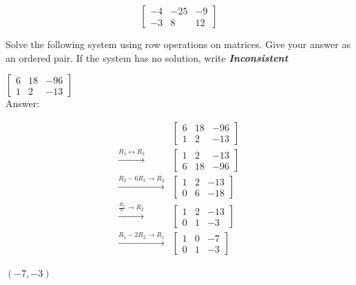 \documentclass[11pt]{exam}
\begin{document}
\begin{questions}
\begin{solution}
\[\boxed{ \left[\begin{array}{cc|c} -4 & -25 & -9 \\ -3 & 8 & 12 \end{array}\right] }\]
\end{solution}
\newpage

\question[6] Solve the following system using row operations on matrices. Give your answer as an ordered pair. If the system has no solution, write \textbf{\textit{Inconsistent}}\\
\renewcommand{\arraystretch}{1}

\(\displaystyle{ \left[\begin{array}{cc|c} 6 & 18 & -96 \\ 1 & 2 & -13 \end{array}\right] }\)\\

 Answer: \fillin[][2in]
\begin{solution}
\[\begin{aligned} & \left[\begin{array}{cc|c} 6 & 18 & -96 \\ 1 & 2 & -13 \end{array}\right] \\ \xrightarrow{R_1 \leftrightarrow R_2} & \left[\begin{array}{cc|c} 1 & 2 & -13 \\ 6 & 18 & -96 \end{array}\right] \\ \xrightarrow{R_2 - 6R_1 \to R_2} & \left[\begin{array}{cc|c} 1 & 2 & -13 \\ 0 & 6 & -18 \end{array}\right] \\ \xrightarrow{\frac{R_2}{6} \to R_2} & \left[\begin{array}{cc|c} 1 & 2 & -13 \\ 0 & 1 & -3 \end{array}\right] \\ \xrightarrow{R_1 - 2R_2 \to R_1} & \left[\begin{array}{cc|c} 1 & 0 & -7 \\ 0 & 1 & -3 \end{array}\right] \end{aligned}\]

\(\boxed{ (-7, -3) }\)
\end{solution}


\end{questions}
\end{document}
